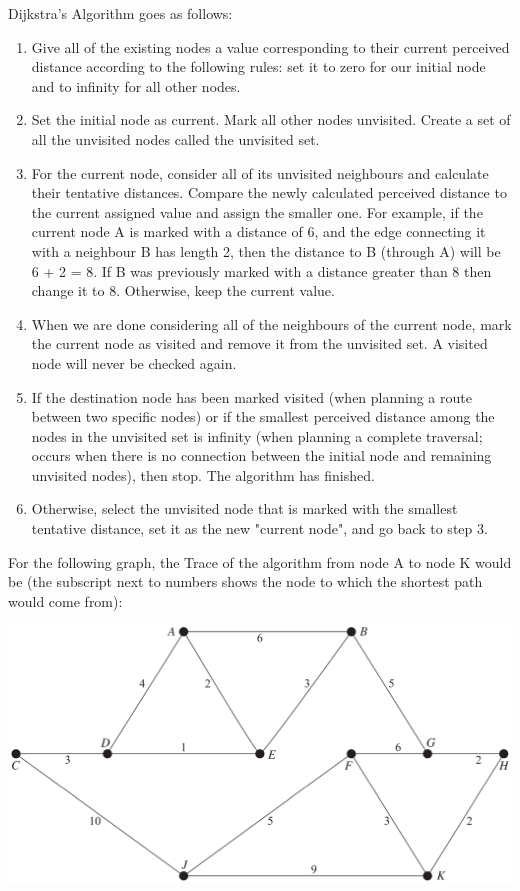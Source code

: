   Dijkstra's Algorithm goes as follows:
  \begin{enumerate}
  	\item Give all of the existing nodes a value corresponding to their current perceived distance according to the following rules: set it to zero for our initial node and to infinity for all other nodes.
  	\item Set the initial node as current. Mark all other nodes unvisited. Create a set of all the unvisited nodes called the unvisited set.
  	\item For the current node, consider all of its unvisited neighbours and calculate their tentative distances. Compare the newly calculated perceived distance to the current assigned value and assign the smaller one. For example, if the current node A is marked with a distance of 6, and the edge connecting it with a neighbour B has length 2, then the distance to B (through A) will be 6 + 2 = 8. If B was previously marked with a distance greater than 8 then change it to 8. Otherwise, keep the current value.
  	\item When we are done considering all of the neighbours of the current node, mark the current node as visited and remove it from the unvisited set. A visited node will never be checked again.
  	\item If the destination node has been marked visited (when planning a route between two specific nodes) or if the smallest perceived distance among the nodes in the unvisited set is infinity (when planning a complete traversal; occurs when there is no connection between the initial node and remaining unvisited nodes), then stop. The algorithm has finished.
  	\item Otherwise, select the unvisited node that is marked with the smallest tentative distance, set it as the new "current node", and go back to step 3.
  \end{enumerate}
  
  For the following graph, the Trace of the algorithm from node A to node K would be (the subscript next to numbers shows the node to which the shortest path would come from):
  \begin{center}
  	\includegraphics[scale=0.4]{Dijkstra-Graph}
  \end{center}
  
